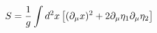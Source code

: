 \begin{equation}
S={1\over g}\int d^2 x\left[ (\partial_{\mu}x)^{2}+
 2\partial_{\mu}\eta_{1}
\partial_{\mu}\eta_{2}\right]\label{basicsigma}
\end{equation}

